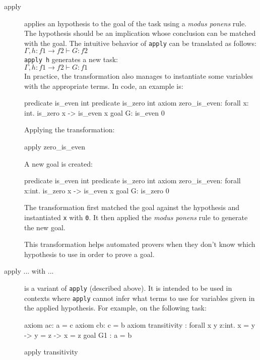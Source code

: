 \begin{description}

\item[apply] applies an hypothesis to the goal of the task using a
  \textit{modus ponens} rule. The hypothesis should be an implication whose
  conclusion can be matched with the goal.
  The intuitive behavior of \texttt{apply} can be translated as follows:\\
  $\Gamma, h: f1 \rightarrow f2 \vdash G: f2$\\
  \texttt{apply h} generates a new task:\\
  $\Gamma, h: f1 \rightarrow f2 \vdash G: f1$\\

  In practice, the transformation also manages to instantiate some variables
  with the appropriate terms. In \why code, an example is:
\begin{whycode}
predicate is_even int
predicate is_zero int
axiom zero_is_even: forall x: int. is_zero x -> is_even x
goal G: is_even 0
\end{whycode}
Applying the transformation:
\begin{transwhy3}
apply zero_is_even
\end{transwhy3}

A new goal is created:
\begin{whycode}
predicate is_even int
predicate is_zero int
axiom zero_is_even: forall x:int. is_zero x -> is_even x
goal G: is_zero 0
\end{whycode}
The transformation first matched the goal against the hypothesis and
instantiated \texttt{x} with \texttt{0}. It then applied the
\textit{modus ponens} rule to generate the new goal.

This transformation helps automated provers when they don't know which
hypothesis to use in order to prove a goal.



\item[apply ... with ...] is a variant of \texttt{apply} (described above). It
  is intended to be used in contexts where \texttt{apply} cannot infer what
  terms to use for variables given in the applied hypothesis.
  For example, on the following task:
\begin{whycode}
axiom ac: a = c
axiom cb: c = b
axiom transitivity : forall x y z:int. x = y -> y = z -> x = z
goal G1 : a = b
\end{whycode}

\begin{transwhy3}
apply transitivity
\end{transwhy3}


\end{description}
